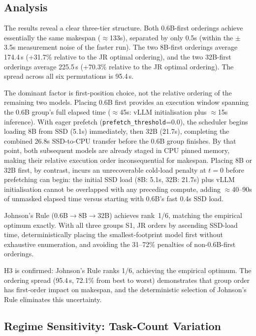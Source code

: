 \documentclass[logo,bsc,singlespacing,parskip,online]{infthesis}
\begin{document}
\subsection{Analysis}

The results reveal a clear three-tier structure. Both 0.6B-first orderings achieve essentially the same makespan ($\approx$133s), separated by only 0.5s (within the $\pm$3.5s measurement noise of the faster run). The two 8B-first orderings average 174.4\,s (+31.7\% relative to the JR optimal ordering), and the two 32B-first orderings average 225.5\,s (+70.3\% relative to the JR optimal ordering). The spread across all six permutations is 95.4\,s.

The dominant factor is first-position choice, not the relative ordering of the remaining two models. Placing 0.6B first provides an execution window spanning the 0.6B group's full elapsed time ($\approx$45s: vLLM initialisation plus $\approx$15s inference). With eager prefetch (\texttt{prefetch\_threshold}=0.0), the scheduler begins loading 8B from SSD (5.1s) immediately, then 32B (21.7s), completing the combined 26.8s SSD-to-CPU transfer before the 0.6B group finishes. By that point, both subsequent models are already staged in CPU pinned memory, making their relative execution order inconsequential for makespan. Placing 8B or 32B first, by contrast, incurs an unrecoverable cold-load penalty at $t=0$ before prefetching can begin: the initial SSD load (8B: 5.1s, 32B: 21.7s) plus vLLM initialisation cannot be overlapped with any preceding compute, adding $\approx$40--90s of unmasked elapsed time versus starting with 0.6B's fast 0.4s SSD load.

Johnson's Rule (0.6B$\to$8B$\to$32B) achieves rank~1/6, matching the empirical optimum exactly. With all three groups S1, JR orders by ascending SSD-load time, deterministically placing the smallest-footprint model first without exhaustive enumeration, and avoiding the 31--72\% penalties of non-0.6B-first orderings.

H3 is confirmed: Johnson's Rule ranks 1/6, achieving the empirical optimum. The ordering spread (95.4\,s, 72.1\% from best to worst) demonstrates that group order has first-order impact on makespan, and the deterministic selection of Johnson's Rule eliminates this uncertainty.

\subsection{Regime Sensitivity: Task-Count Variation}
\end{document}

